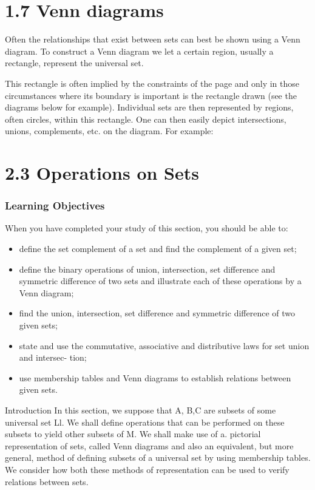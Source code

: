 {{{\section{1.7 Venn diagrams}
Often the relationships that exist between sets can best be shown using a
Venn diagram. To construct a Venn diagram we let a certain region, usually
a rectangle, represent the universal set. 

This rectangle is often implied
by the constraints of the page and only in those circumstances where its
boundary is important is the rectangle drawn (see the diagrams below for
example). Individual sets are then represented by regions, often circles,
within this rectangle. One can then easily depict intersections, unions,
complements, etc. on the diagram. For example:

\section{2.3 Operations on Sets}
\frametitle{Learning Objectives}
When you have completed your study of this section, you should be able to:
\begin{itemize}
\item deﬁne the set complement of a set and ﬁnd the complement of a given set;
\item deﬁne the binary operations of union, intersection, set difference and symmetric difference of
two sets and illustrate each of these operations by a Venn diagram;
\item  ﬁnd the union, intersection, set difference and symmetric difference of two given sets;
\item  state and use the commutative, associative and distributive laws for set union and intersec-
tion;
\item  use membership tables and Venn diagrams to establish relations between given sets.
\end{itemize}

\smallskip 
Introduction
In this section, we suppose that A, B,C are subsets of some universal set Ll. We shall deﬁne
operations that can be performed on these subsets to yield other subsets of M. We shall make
use of a. pictorial representation of sets, called Venn diagrams and also an equivalent, but more
general, method of deﬁning subsets of a universal set by using membership tables. We consider
how both these methods of representation can be used to verify relations between sets.



}}}
